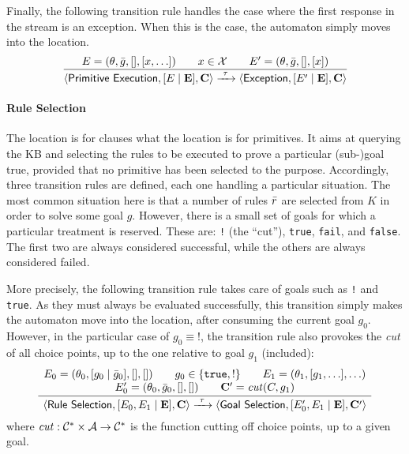 \documentclass[12pt,a4paper,openright,twoside]{book}
\begin{document}
Finally, the following transition rule handles the case where the first response in the stream is an exception.
%
When this is the case, the automaton simply moves into the  location.
\[
\frac{
    E = (\theta, \bar{g}, [], [x, \ldots])
    \qquad
    x \in \mathcal{X}
    \qquad
    E' = (\theta, \bar{g}, [], [x])
}{
    \langle \textsf{Primitive Execution}, [E \mid \mathbf{E}], \mathbf{C} \rangle
    \xrightarrow{\ \tau\ }
    \langle \textsf{Exception}, [E' \mid \mathbf{E}], \mathbf{C} \rangle
}
\]

\paragraph{Rule Selection}

The  location is for clauses what the  location is for primitives.
%
It aims at querying the KB and selecting the rules to be executed to prove a particular (sub-)goal true, provided that no primitive has been selected to the purpose.
%
Accordingly, three transition rules are defined, each one handling a particular situation.
%
The most common situation here is that a number of rules $\bar{r}$ are selected from $K$ in order to solve some goal $g$.
%
However, there is a small set of goals for which a particular treatment is reserved.
%
These are: \texttt{!} (the ``cut''), \texttt{true}, \texttt{fail}, and \texttt{false}.
%
The first two are always considered successful, while the others are always considered failed.

More precisely, the following transition rule takes care of goals such as \texttt{!} and \texttt{true}.
%
As they must always be evaluated successfully, this transition simply makes the automaton move into the  location, after consuming the current goal $g_0$.
%
However, in the particular case of $g_0 \equiv \mathtt{!}$, the transition rule also provokes the \emph{cut} of all choice points, up to the one relative to goal $g_1$ (included):
%
%
\[
\frac{
    \begin{array}{c}
        E_0 = (\theta_0, [g_0 \mid \bar{g}_0], [], [])
        \qquad
        g_0 \in \{ \mathtt{true}, \mathtt{!} \}
        \qquad
        E_1 = (\theta_1, [g_1, \ldots], \ldots)
        \\
        E'_0 = (\theta_0, \bar{g}_0, [], [])
        \qquad
        \mathbf{C}' = \mathit{cut}(C, g_1)
    \end{array}
}{
    \langle \textsf{Rule Selection}, [E_0, E_1 \mid \mathbf{E}], \mathbf{C} \rangle
    \xrightarrow{\ \tau\ }
    \langle \textsf{Goal Selection}, [E'_0, E_1 \mid \mathbf{E}], \mathbf{C}' \rangle
}
\]
%
where $\mathit{cut} : \mathcal{C^*} \times \mathcal{A} \rightarrow \mathcal{C^*}$ is the function cutting off choice points, up to a given goal.
\end{document}
